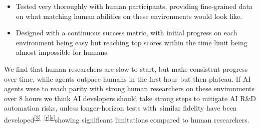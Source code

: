\documentclass[
]{article}
\providecommand{\tightlist}{%
  \setlength{\itemsep}{0pt}\setlength{\parskip}{0pt}}
\begin{document}
\begin{itemize}
\tightlist
\item
  {Tested very thoroughly with human participants, providing
  fine-grained data on what matching human abilities on these
  environments would look like.}
\item
  {Designed with a continuous success metric, with initial progress on
  each environment being easy but reaching top scores within the time
  limit being almost impossible for humans.}
\end{itemize}

{}

{We find that human researchers are slow to start, but make consistent
progress over time, while agents outpace humans in the first hour but
then plateau. If AI agents were to reach parity with strong human
researchers on these environments over 8 hours we think AI developers
should take strong steps to mitigate AI R\&D automation risks, unless
longer-horizon tests with}{~similar fidelity have been
developed}\textsuperscript{\label{ftnt_ref3}\hyperref[ftnt3]{{[}3{]}}}{~}\textsuperscript{\label{cmnt_ref18}\hyperref[cmnt18]{{[}r{]}}\label{cmnt_ref19}\hyperref[cmnt19]{{[}s{]}}}{showing
significant limitations compared to human researchers.}
\end{document}
